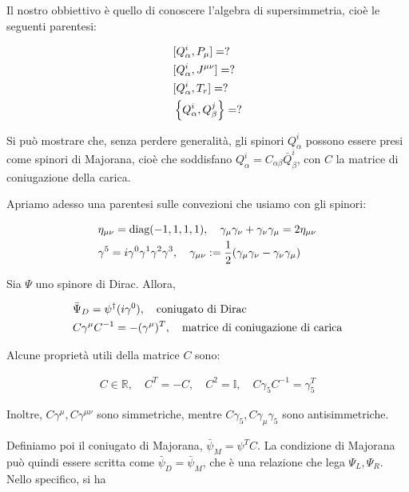 \documentclass{report}
\begin{document}
Il nostro obbiettivo è quello di conoscere l'algebra di supersimmetria, cioè le seguenti parentesi: 

\begin{align}
    &[Q^i_\alpha, P_\mu] = ? \notag \\
    &[Q^i_\alpha, J^{\mu\nu}] = ? \notag \\ 
    &[Q^i_\alpha, T_r] = ? \notag \\ 
    &\left\{Q^i_\alpha, Q^j_\beta\right\} = ? 
\end{align}

Si può mostrare che, senza perdere generalità, gli spinori \(Q_\alpha^i\) possono essere presi come spinori di Majorana, cioè che soddisfano \(Q_\alpha^i = C_{\alpha \beta}\bar{Q}^i_\beta\), con \(C\) la matrice di coniugazione della carica. 

Apriamo adesso una parentesi sulle convezioni che usiamo con gli spinori: 

\begin{align}
    &\eta_{\mu\nu} = \text{diag}(-1, 1, 1, 1), \quad \gamma_\mu \gamma_\nu + \gamma_\nu \gamma_\mu = 2\eta_{\mu\nu} \notag \\
    &\gamma^5 = i\gamma^0\gamma^1\gamma^2\gamma^3, \quad \gamma_{\mu\nu} := \frac{1}{2}(\gamma_\mu\gamma_\nu - \gamma_\nu\gamma_\mu)
\end{align}

Sia \(\Psi\) uno spinore di Dirac. Allora, 

\begin{align}
    &\bar{\Psi}_D = \psi^\dagger (i\gamma^0), \quad \text{coniugato di Dirac} \notag \\
    &C\gamma^\mu C^{-1} = -(\gamma^\mu)^T, \quad \text{matrice di coniugazione di carica}
\end{align}

Alcune proprietà utili della matrice \(C\) sono: 

\begin{align}
    C \in \mathbb{R}, \quad C^T = -C, \quad C^2 = \mathbb{I}, \quad C\gamma_5C^{-1} = \gamma_5^T
\end{align}

Inoltre,  \(C\gamma^\mu, C\gamma^{\mu\nu}\) sono simmetriche, mentre \(C\gamma_5, C\gamma_\mu\gamma_5\) sono antisimmetriche. 

Definiamo poi il coniugato di Majorana, \(\bar{\psi}_M = \psi^T C\).  La condizione di Majorana può quindi essere scritta come \(\bar{\psi}_D = \bar{\psi}_M\), che è una relazione che lega \(\Psi_L, \Psi_R\). Nello specifico, si ha 
\end{document}
